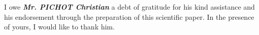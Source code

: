 
\begin{acknowledgements}      

\begin{flushleft}
	I owe \textbf{\textit{Mr. PICHOT Christian}} a debt of gratitude for his kind assistance and his endorsement through the preparation of this scientific paper. In the presence of yours, I would like to thank him. 
\end{flushleft}

\end{acknowledgements}

